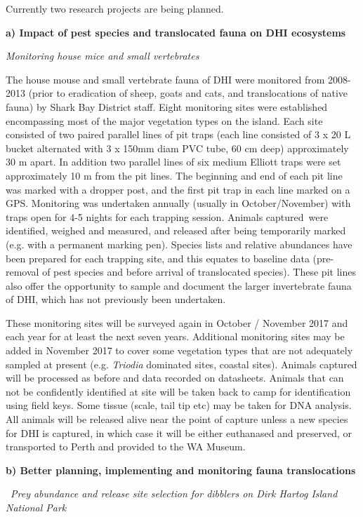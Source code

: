 \documentclass[version=last,
    paper=a4,                               %
    10pt,                                   %
    dvipsnames,
    oneside,                              %
    headings=openany,                       %
    open=any,
    BCOR=7mm,                               %
    DIV=15,     %
]{scrbook}
\begin{document}
Currently two research projects are being planned.~

\textbf{a) Impact of pest species and translocated fauna on DHI
ecosystems}

\emph{Monitoring house mice and small vertebrates}

The house mouse and small vertebrate fauna of DHI were monitored from
2008-2013 (prior to eradication of sheep, goats and cats, and
translocations of native fauna) by Shark Bay District staff. Eight
monitoring sites were established encompassing most of the major
vegetation types on the island. Each site consisted of two paired
parallel lines of pit traps (each line consisted of 3 x 20 L bucket
alternated with 3 x 150mm diam PVC tube, 60 cm deep) approximately 30 m
apart. In addition two parallel lines of six medium Elliott traps were
set approximately 10 m from the pit lines. The beginning and end of each
pit line was marked with a dropper post, and the first pit trap in each
line marked on a GPS. Monitoring was undertaken annually (usually in
October/November) with traps open for 4-5 nights for each trapping
session. Animals captured~were identified, weighed and measured, and
released after being temporarily marked (e.g. with a permanent marking
pen). Species lists and relative abundances have been prepared for each
trapping site, and this equates to baseline data (pre-removal of pest
species and before arrival of translocated species). These pit lines
also offer the opportunity to sample and document the larger
invertebrate fauna of DHI, which has not previously been undertaken.

These monitoring sites will be surveyed again in October / November 2017
and each year for at least the next seven years. Additional monitoring
sites may be added in November 2017 to cover some vegetation types that
are not adequately sampled at present (e.g. \emph{Triodia} dominated
sites, coastal sites). Animals captured will be processed as before and
data recorded on datasheets. Animals that can not be confidently
identified at site will be taken back to camp for identification using
field keys. Some tissue (scale, tail tip etc) may be taken for DNA
analysis. All animals will be released alive near the point of capture
unless a new species for DHI is captured, in which case it will be
either euthanased and preserved, or transported to Perth and provided to
the WA Museum.

\textbf{b) Better planning, implementing and monitoring fauna
translocations}

~\emph{Prey abundance and release site selection for dibblers on Dirk
Hartog Island National Park}
\end{document}
